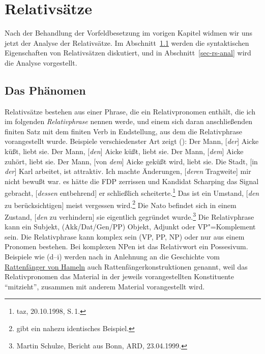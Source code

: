 
\chapter{Relativsätze}
\label{Kapitel-rs}

{%
Nach der Behandlung der Vorfeldbesetzung im vorigen Kapitel widmen wir uns jetzt
der Analyse der Relativsätze. Im Abschnitt~\ref{sec-rs-phenomena} werden die syntaktischen
Eigenschaften von Relativsätzen diskutiert, und in Abschnitt~\ref{sec-rs-anal}
wird die Analyse vorgestellt.

\section{Das Phänomen}
\label{sec-rs-phenomena}

Relativsätze bestehen aus einer Phrase, die ein Relativpronomen enthält, die ich im folgenden
\emph{Relativphrase} nennen werde, und einem sich daran anschließenden finiten Satz mit dem finiten Verb in 
Endstellung, aus dem die Relativphrase vorangestellt wurde. Beispiele verschiedenster Art zeigt ():
\eal
\label{bsp-relativsaetze}
\ex Der Mann, [\emph{der}] Aicke küßt, liebt sie. \label{r1}
\ex Der Mann, [\emph{den}] Aicke küßt, liebt sie. \label{r1b}
\ex Der Mann, [\emph{dem}] Aicke zuhört, liebt sie.\label{r1c}
\ex Der Mann, [von \emph{dem}] Aicke geküßt wird, liebt sie. \label{r2}
\ex Die Stadt, [in \emph{der}] Karl arbeitet, ist attraktiv. \label{r3}
\ex Ich machte Änderungen, [\emph{deren} Tragweite] mir nicht bewußt war.\label{r4}
\ex es hätte die FDP zerrissen und Kandidat Scharping das Signal gebracht, [\emph{dessen} entbehrend] er schließlich scheiterte.\footnote{
  taz, 20.10.1998, S.\,1.}
\ex Das ist ein Umstand, [\emph{den} zu berücksichtigen] meist vergessen wird.\label{r5}\footnote{
  \citet[]{Bech55a} gibt ein nahezu identisches Beispiel.%
}
\ex Die Nato befindet sich in einem Zustand, [\emph{den} zu verhindern] sie eigentlich gegründet wurde.\footnote{
  Martin Schulze, Bericht aus Bonn, ARD, 23.04.1999.}
\zl
Die Relativphrase kann ein Subjekt, (Akk/Dat/Gen/PP) Objekt, Adjunkt oder VP"=Komplement sein.
\label{page-rattenfaenger}%
Die Relativphrase kann komplex sein (VP, PP, NP) oder nur aus einem Pronomen bestehen.
Bei komplexen NPen ist das Relativwort ein Possesivum. 
Beispiele wie (d--i) werden nach \citet*[]{Ross67} in Anlehnung an die Geschichte vom 
\href{http://www.hameln.de/tourismus/rattenfaenger/}{Rat\-ten\-fän\-ger von Hameln} 
auch Rattenfängerkonstruktionen genannt,
weil das Relativpronomen das Material in der jeweils vorangestellten Konstituente "`mitzieht"', \dash
zusammen mit anderem Material vorangestellt wird.

}
